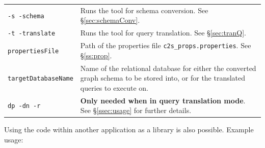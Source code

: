 \documentclass[letterpaper]{ltxdoc}
\begin{document}
\begin{center}
\begin{tabular}{ p{3cm} p{10.5cm} }
\texttt{-s \textbar{} -schema} & Runs the tool for schema conversion. See \S \ref{sec:schemaConv}. \\
\texttt{-t \textbar{} -translate} & Runs the tool for query translation. See \S \ref{sec:tranQ}. \\
\texttt{propertiesFile} & Path of the properties file \texttt{c2s\_props.properties}. See \S \ref{ss:prop}. \\
\texttt{targetDatabaseName} & Name of the relational database for either the converted graph schema to be stored into, or for the translated queries to execute on. \\
\texttt{dp \textbar{} -dn \textbar{} -r} & \textbf{Only needed when in query translation mode}. See \S \ref{ssec:usage} for further details.
\end{tabular}
\end{center}

\medskip

Using the code within another application as a library is also possible. Example usage:
\end{document}
